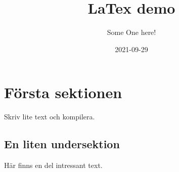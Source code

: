 \documentclass{article}
\title{LaTex demo}
\author{Some One here!}
\date{2021-09-29}
\begin{document}
\maketitle


\section{Första sektionen}

Skriv lite text och kompilera.

\subsection{En liten undersektion}
Här finns en del intressant text.


\tableofcontents
\end{document}
